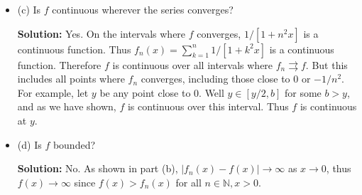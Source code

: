 \documentclass[12pt]{article}
\begin{document}
\begin{itemize}[label={},leftmargin=4mm, itemsep=1em, parsep=1em]
  \item (c) Is $f$ continuous wherever the series converges?

  {\bf Solution:} Yes. On the intervals where $f$ converges, $1 / [1+n^{2}x]$ is
  a continuous function. Thus $f_{n}(x) = \sum_{k=1}^{n}1 / [1+k^{2}x]$ is a
  continuous function. Therefore $f$ is continuous over all intervals where
  $f_{n}\rightrightarrows f$. But this includes all points where $f_{n}$ converges,
  including those close to $0$ or $-1/n^{2}$. For example, let $y$ be any point
  close to 0. Well $y \in [y/2, b]$ for some $b > y$, and as we have shown, $f$
  is continuous over this interval. Thus $f$ is continuous at $y$.

  \item (d) Is $f$ bounded?

  {\bf Solution:} No. As shown in part (b), $|f_{n}(x) - f(x)| \rightarrow
  \infty$ as $x \rightarrow 0$, thus $f(x) \rightarrow \infty$ since $f(x) >
  f_{n}(x)$ for all $n\in\mathbb{N}, x > 0$.
\end{itemize}
\end{document}

